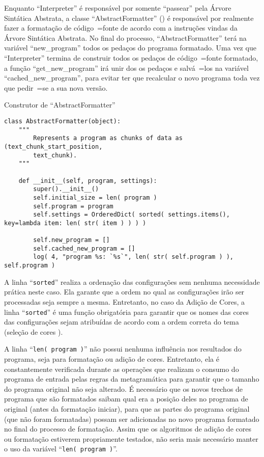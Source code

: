 Enquanto ``Interpreter'' é responsável por somente ``passear'' pela Árvore Sintática Abstrata,
a classe ``AbstractFormatter'' () é responsável por realmente fazer a formatação de código~=fonte de acordo com a instruções vindas da Árvore Sintática Abstrata.
No final do processo,
``AbstractFormatter'' terá na variável ``new\_program'' todos os pedaços do programa formatado.
Uma vez que ``Interpreter'' termina de construir todos os pedaços de código~=fonte formatado,
a função ``get\_new\_program'' irá unir dos os pedaços e
salvá~=los na variável ``cached\_new\_program'',
para evitar ter que recalcular o novo programa toda vez que pedir~=se a sua nova versão.
\begin{code}
\caption{Construtor de ``AbstractFormatter''}
\label{construtorDeParsedProgram}
\begin{verbatim}
class AbstractFormatter(object):
    """
        Represents a program as chunks of data as (text_chunk_start_position,
        text_chunk).
    """

    def __init__(self, program, settings):
        super().__init__()
        self.initial_size = len( program )
        self.program = program
        self.settings = OrderedDict( sorted( settings.items(), key=lambda item: len( str( item ) ) ) )

        self.new_program = []
        self.cached_new_program = []
        log( 4, "program %s: `%s`", len( str( self.program ) ), self.program )
\end{verbatim}
\end{code}

A linha ``\texttt{sorted}'' realiza a ordenação das configurações sem nenhuma necessidade prática neste caso.
Ela garante que a ordem no qual as configurações irão ser processadas seja sempre a mesma.
Entretanto,
no caso da Adição de Cores,
a linha ``\texttt{sorted}'' é uma função obrigatória para garantir que os nomes das cores das configurações sejam atribuídas de acordo com a ordem correta do tema (seleção de cores \cite{vsCodeSyntaxHighlighthing,sublimeTextScopeNaming}).

A linha ``\texttt{len( program )}'' não possui nenhuma influência nos resultados do programa,
seja para formatação ou
adição de cores.
Entretanto,
ela é constantemente verificada durante as operações que realizam o consumo do programa de entrada pelas regras da metagramática para garantir que o tamanho do programa original não seja alterado.
É necessário que os novos trechos de programa que são formatados saibam qual era a posição deles no programa de original (antes da formatação iniciar),
para que as partes do programa original (que não foram formatadas) possam ser adicionadas no novo programa formatado no final do processo de formatação.
Assim que os algoritmos de adição de cores ou
formatação estiverem propriamente testados,
não seria mais necessário manter o uso da variável ``\texttt{len( program )}''.

